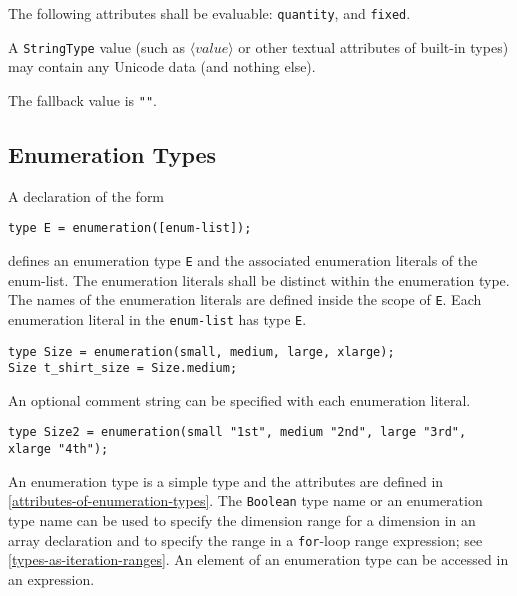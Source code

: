 The following attributes shall be evaluable: \lstinline!quantity!, and \lstinline!fixed!.

A \lstinline!StringType! value (such as $\langle\mathit{value}\rangle$ or other textual attributes of built-in types) may contain any Unicode data (and nothing else).

The fallback value is \lstinline!""!.

\subsection{Enumeration Types}\label{enumeration-types}

A declaration of the form
\begin{lstlisting}[language=modelica]
type E = enumeration([enum-list]);
\end{lstlisting}%
defines an enumeration type \lstinline!E! and the associated enumeration literals of
the enum-list. The enumeration literals shall be distinct within the
enumeration type. The names of the enumeration literals are defined
inside the scope of \lstinline!E!. Each enumeration literal in the \lstinline!enum-list! has
type \lstinline!E!.

\begin{example}
\begin{lstlisting}[language=modelica]
type Size = enumeration(small, medium, large, xlarge);
Size t_shirt_size = Size.medium;
\end{lstlisting}
\end{example}

An optional comment string can be specified with each enumeration literal.

\begin{example}
\begin{lstlisting}[language=modelica]
type Size2 = enumeration(small "1st", medium "2nd", large "3rd", xlarge "4th");
\end{lstlisting}
\end{example}

An enumeration type is a simple type and the attributes are defined in \cref{attributes-of-enumeration-types}.
The \lstinline!Boolean! type name or an enumeration type name can be used to specify the dimension range for a dimension in an array declaration and to specify the range in a \lstinline!for!-loop range expression; see \cref{types-as-iteration-ranges}.
An element of an enumeration type can be accessed in an expression.

